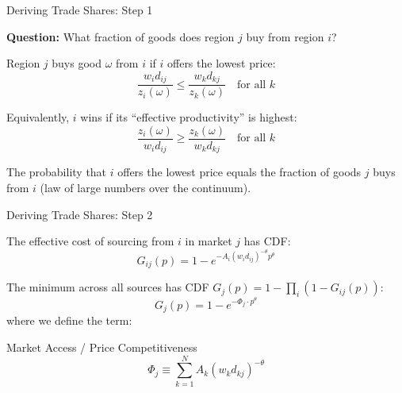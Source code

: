 \documentclass{beamer}
\begin{document}
\begin{frame}{Deriving Trade Shares: Step 1}

    \textbf{Question:} What fraction of goods does region $j$ buy from region $i$?

    \vspace{0.2em}
    Region $j$ buys good $\omega$ from $i$ if $i$ offers the lowest price:
    \[ \frac{w_i d_{ij}}{z_i(\omega)} \leq \frac{w_k d_{kj}}{z_k(\omega)} \quad \text{for all } k \]

    Equivalently, $i$ wins if its ``effective productivity'' is highest:
    \[ \frac{z_i(\omega)}{w_i d_{ij}} \geq \frac{z_k(\omega)}{w_k d_{kj}} \quad \text{for all } k \]

    \vspace{0.2em}
     The probability that $i$ offers the lowest price equals the fraction of goods $j$ buys from $i$ (law of large numbers over the continuum).

\end{frame}

\begin{frame}{Deriving Trade Shares: Step 2}

    The effective cost of sourcing from $i$ in market $j$ has CDF:
    \[ G_{ij}(p) = 1 - e^{-A_i (w_i d_{ij})^{-\theta} p^{\theta}} \]

    The minimum across all sources has CDF $G_j(p) = 1 - \prod_i (1 - G_{ij}(p))$:
    \[ G_j(p) = 1 - e^{-\Phi_j \cdot p^{\theta}} \]
    where we define the  term:

    \begin{block}{Market Access / Price Competitiveness}
        \vspace{-0.5em}
        \[ \Phi_j \equiv \sum_{k=1}^{N} A_k (w_k d_{kj})^{-\theta} \]
    \end{block}


\end{frame}
\end{document}
